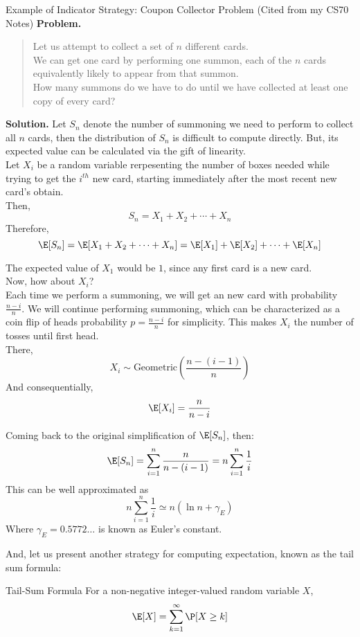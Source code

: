 \begin{ln-explain}{Example of Indicator Strategy: Coupon Collector Problem (Cited from my CS70 Notes)}{}
    \textbf{Problem.}
    \begin{quote}
        Let us attempt to collect a set of $n$ different cards. \\
        We can get one card by performing one summon, each of the $n$ cards equivalently likely to appear from that summon. \\
        How many summons do we have to do until we have collected at least one copy of every card?
    \end{quote}
    \tcblower
    \textbf{Solution.}
    Let $S_n$ denote the number of summoning we need to perform to collect all $n$ cards, then the distribution of $S_n$ is difficult to compute directly. But, its expected value can be calculated via the gift of linearity. \\
    Let $X_i$ be a random variable rerpesenting the number of boxes needed while trying to get the $i^{th}$ new card, starting immediately after the most recent new card's obtain. \\
    Then,
    \[S_n = X_1 + X_2 + \cdots + X_n\]
    Therefore,
    \[\E[S_n] = \E[X_1 + X_2 + \cdots + X_n] = \E[X_1] + \E[X_2] + \cdots + \E[X_n]\]

    The expected value of $X_1$ would be $1$, since any first card is a new card. \\
    Now, how about $X_i$? \\
    Each time we perform a summoning, we will get an new card with probability $\frac{n - i}{n}$. We will continue performing summoning, which can be characterized as a coin flip of heads probability $p = \frac{n - i}{n}$ for simplicity. This makes $X_i$ the number of tosses until first head. \\
    There, 
    \[X_i \sim \text{Geometric}(\frac{n - (i - 1)}{n})\]
    And consequentially,
    \[\E[X_i] = \frac{n}{n - i}\]

    Coming back to the original simplification of $\E[S_n]$, then:
    \[
        \E[S_n] = \sum_{i = 1}^n \frac{n}{n - (i - 1)} = n\sum_{i = 1}^n \frac{1}{i}
    \]
    This can be well approximated as
    \[
        n\sum_{i = 1}^n \frac{1}{i} \simeq n(\ln{n} + \gamma_E)
    \]
    Where $\gamma_E=0.5772\dots$ is known as Euler's constant.
\end{ln-explain}
And, let us present another strategy for computing expectation, known as the tail sum formula:
\begin{ln-theorem}{Tail-Sum Formula}{}
    For a non-negative integer-valued random variable $X$,
    \[
        \E[X] = \sum_{k = 1}^{\infty} \P[X \geq k]
    \]
\end{ln-theorem}
